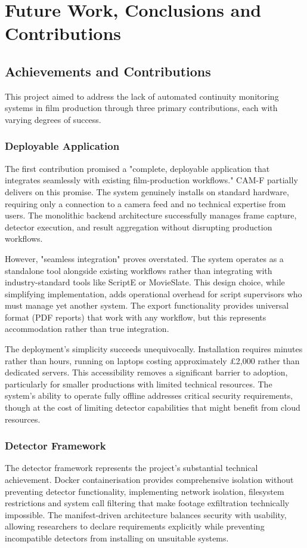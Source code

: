 \chapter{Future Work, Conclusions and Contributions}

\section{Achievements and Contributions}
This project aimed to address the lack of automated continuity monitoring systems in film production through three primary contributions, each with varying degrees of success.

\subsection{Deployable Application}
The first contribution promised a "complete, deployable application that integrates seamlessly with existing film-production workflows." CAM-F partially delivers on this promise. The system genuinely installs on standard hardware, requiring only a connection to a camera feed and no technical expertise from users. The monolithic backend architecture successfully manages frame capture, detector execution, and result aggregation without disrupting production workflows.

However, "seamless integration" proves overstated. The system operates as a standalone tool alongside existing workflows rather than integrating with industry-standard tools like ScriptE or MovieSlate. This design choice, while simplifying implementation, adds operational overhead for script supervisors who must manage yet another system. The export functionality provides universal format (PDF reports) that work with any workflow, but this represents accommodation rather than true integration.

The deployment's simplicity succeeds unequivocally. Installation requires minutes rather than hours, running on laptops costing approximately £2,000 rather than dedicated servers. This accessibility removes a significant barrier to adoption, particularly for smaller productions with limited technical resources. The system's ability to operate fully offline addresses critical security requirements, though at the cost of limiting detector capabilities that might benefit from cloud resources.

\subsection{Detector Framework}
The detector framework represents the project's substantial technical achievement. Docker containerisation provides comprehensive isolation without preventing detector functionality, implementing network isolation, filesystem restrictions and system call filtering that make footage exfiltration technically impossible. The manifest-driven architecture balances security with usability, allowing researchers to declare requirements explicitly while preventing incompatible detectors from installing on unsuitable systems.


